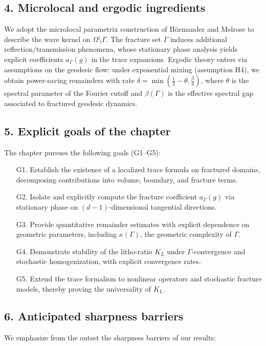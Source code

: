 \subsection*{4. Microlocal and ergodic ingredients}
We adopt the microlocal parametrix construction of Hörmander \cite{Hormander1985}
and Melrose \cite{Melrose1994} to describe the wave kernel on $\Omega\setminus\Gamma$.
The fracture set $\Gamma$ induces additional reflection/transmission phenomena, whose
stationary phase analysis yields explicit coefficients $a_\Gamma(g)$ in the trace
expansions. Ergodic theory enters via assumptions on the geodesic flow: under
exponential mixing (assumption H4), we obtain power-saving remainders with rate
$\delta = \min(\tfrac{1}{2}-\theta, \tfrac{\beta}{4})$, where $\theta$ is the
spectral parameter of the Fourier cutoff and $\beta(\Gamma)$ is the effective
spectral gap associated to fractured geodesic dynamics.

\subsection*{5. Explicit goals of the chapter}
The chapter pursues the following goals (G1--G5):

\begin{itemize}
  \item[G1.] Establish the existence of a localized trace formula on fractured domains,
  decomposing contributions into volume, boundary, and fracture terms.
  \item[G2.] Isolate and explicitly compute the fracture coefficient $a_\Gamma(g)$
  via stationary phase on $(d-1)$-dimensional tangential directions.
  \item[G3.] Provide quantitative remainder estimates with explicit dependence on
  geometric parameters, including $\kappa(\Gamma)$, the geometric complexity of $\Gamma$.
  \item[G4.] Demonstrate stability of the litho-ratio $K_L$ under $\Gamma$-convergence
  and stochastic homogenization, with explicit convergence rates.
  \item[G5.] Extend the trace formalism to nonlinear operators and stochastic fracture
  models, thereby proving the universality of $K_L$.
\end{itemize}

\subsection*{6. Anticipated sharpness barriers}
We emphasize from the outset the sharpness barriers of our results:

